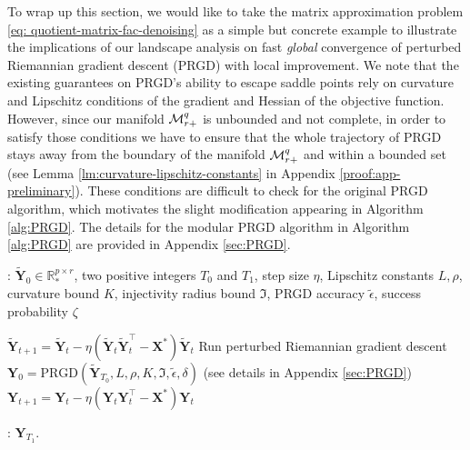\documentclass[11pt]{article}
\newcommand{\bbR}{\mathbb{R}}
\newcommand{\0}{{\mathbf{0}}}
\newcommand{\1}{{\mathbf{1}}}
\newcommand{\X}{{\mathbf{X}}}
\newcommand{\Y}{{\mathbf{Y}}}
\newcommand{\cM}{{\cal M}}
\begin{document}
{To wrap up this section, we would like to take the matrix approximation problem \eqref{eq: quotient-matrix-fac-denoising} as a simple but concrete example to illustrate the implications of our landscape analysis on fast \textit{global} convergence of perturbed Riemannian gradient descent (PRGD) with local improvement. We note that the existing guarantees on PRGD's ability to escape saddle points rely on curvature and Lipschitz conditions of the gradient and Hessian \cite{criscitiello2019efficiently,sun2019escaping} of the objective function. However, since our manifold $\cM_{r+}^q$ is unbounded and not complete, in order to satisfy those conditions we have to ensure that the whole trajectory of PRGD stays away from the boundary of the manifold $\cM_{r+}^q$ and within a bounded set (see Lemma \ref{lm:curvature-lipschitz-constants} in Appendix \ref{proof:app-preliminary}). These conditions are difficult to check for the original PRGD algorithm, which motivates the slight modification appearing in Algorithm \ref{alg:PRGD}. The details for the modular PRGD algorithm in Algorithm \ref{alg:PRGD} are provided in Appendix \ref{sec:PRGD}. 
\begin{algorithm}[h]
\caption{Perturbed Riemannian Gradient Descent with Initial Safeguard and Local Improvement}
: $\widetilde{\Y}_0 \in \bbR_{*}^{p \times r} $, two positive integers $T_0$ and $T_1$, step size $\eta$, Lipschitz constants $L, \rho$, curvature bound $K$, injectivity radius bound $\mathfrak{I}$, PRGD accuracy $\widetilde{\epsilon}$, success probability $\zeta$
\begin{algorithmic}[1]
	\State $\widetilde{\Y}_{t + 1} = \widetilde{\Y}_{t} -   \eta (\widetilde{\Y}_t \widetilde{\Y}_t^\top - \X^*  ) \widetilde{\Y}_t$
	\EndFor
	\State Run perturbed Riemannian gradient descent $\Y_0 = \text{PRGD}(\widetilde{\Y}_{T_0}, L, \rho, K, \mathfrak{I}, \widetilde{\epsilon}, \delta)$ (see details in Appendix \ref{sec:PRGD})
	\State $\Y_{t + 1} = \Y_{t} -   \eta (\Y_t \Y_t^\top - \X^*  )\Y_t$
	\EndFor
\end{algorithmic}
: $\Y_{T_1}$.
\label{alg:PRGD}
\end{algorithm}


}
\end{document}
